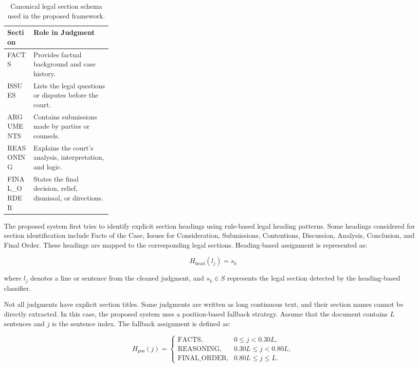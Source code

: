 \begin{table}[H]
\centering
\caption{Canonical legal section schema used in the proposed framework.}
\label{tab:section_schema}
\renewcommand{\arraystretch}{1.25}
\begin{tabularx}{\linewidth}{@{}p{0.25\linewidth}X@{}}
\toprule
\textbf{Section} & \textbf{Role in Judgment} \\
\midrule
FACTS & Provides factual background and case history. \\
ISSUES & Lists the legal questions or disputes before the court. \\
ARGUMENTS & Contains submissions made by parties or counsels. \\
REASONING & Explains the court's analysis, interpretation, and logic. \\
FINAL\_ORDER & States the final decision, relief, dismissal, or directions. \\
\bottomrule
\end{tabularx}
\end{table}

The proposed system first tries to identify explicit section headings using rule-based legal heading patterns. Some headings considered for section identification include Facts of the Case, Issues for Consideration, Submissions, Contentions, Discussion, Analysis, Conclusion, and Final Order. These headings are mapped to the corresponding legal sections. Heading-based assignment is represented as:

\begin{equation}
H_{\text{head}}(l_j) = s_k
\end{equation}

where \(l_j\) denotes a line or sentence from the cleaned judgment, and 
\(s_k \in S\) represents the legal section detected by the heading-based 
classifier.

Not all judgments have explicit section titles. Some judgments are written as long continuous text, and their section names cannot be directly extracted. In this case, the proposed system uses a position-based fallback strategy. Assume that the document contains \(L\) sentences and \(j\) is the sentence index. The fallback assignment is defined as:

\begin{equation}
H_{\text{pos}}(j)=
\begin{cases}
\text{FACTS}, & 0 \leq j < 0.30L, \\
\text{REASONING}, & 0.30L \leq j < 0.80L, \\
\text{FINAL\_ORDER}, & 0.80L \leq j \leq L.
\end{cases}
\end{equation}

